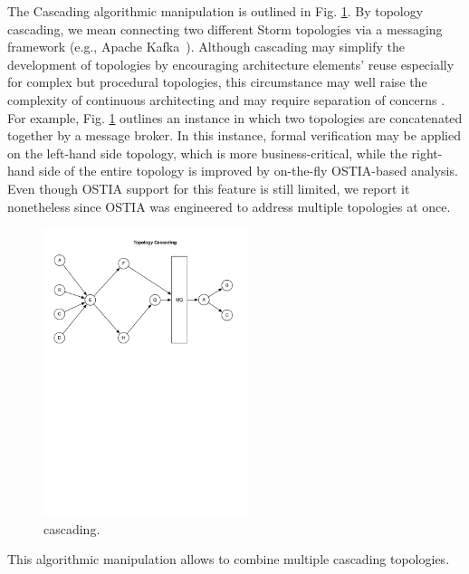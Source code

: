 The Cascading algorithmic manipulation is outlined in Fig. \ref{fig:cascading}. By topology cascading, we mean connecting two different Storm topologies via a messaging framework (e.g., Apache Kafka~\cite{kafka}).
Although cascading may simplify the development of topologies by encouraging architecture elements' reuse especially for complex but procedural topologies, this circumstance may well raise the complexity of continuous architecting and may require separation of concerns \cite{soc}. For example, Fig. \ref{fig:cascading} outlines an instance in which two topologies are concatenated together by a message broker. In this instance, formal verification may be applied on the left-hand side topology, which is more business-critical, while the right-hand side of the entire topology is improved by on-the-fly OSTIA-based analysis. Even though OSTIA support for this feature is still limited, we report it nonetheless since OSTIA was engineered to address multiple topologies at once. 

\begin{figure}
	\begin{center}
		\includegraphics[width=6cm]{images/cascading}
		\caption{cascading.}
		\label{fig:cascading}
	\end{center}
\end{figure}

This algorithmic manipulation allows to combine multiple cascading topologies.

